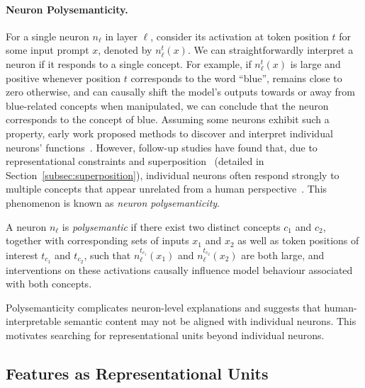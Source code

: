 \paragraph{Neuron Polysemanticity.}
For a single neuron $n_\ell$ in layer $\ell$, consider its activation at token position $t$ for some input prompt $x$, denoted by $n_\ell^{t}(x)$. We can straightforwardly interpret a neuron if it responds to a single concept. For example, if $n_\ell^{t}(x)$ is large and positive whenever position $t$ corresponds to the word ``blue'', remains close to zero otherwise, and can causally shift the model's outputs towards or away from blue-related concepts when manipulated, we can conclude that the neuron corresponds to the concept of blue. Assuming some neurons exhibit such a property, early work proposed methods to discover and interpret individual neurons' functions~. However, follow-up studies have found that, due to representational constraints and superposition~ (detailed in Section~\ref{subsec:superposition}), individual neurons often respond strongly to multiple concepts that appear unrelated from a human perspective~. This phenomenon is known as \textit{neuron polysemanticity}.



\begin{definitionbox}
A neuron $n_\ell$ is \emph{polysemantic} if there exist two distinct concepts $c_1$ and $c_2$, together with corresponding sets of inputs $x_1$ and $x_2$ as well as token positions of interest $t_{c_1}$ and $t_{c_2}$, such that $n_\ell^{t_{c_1}}(x_1)$ and $n_\ell^{t_{c_2}}(x_2)$ are both large, and interventions on these activations causally influence model behaviour associated with both concepts.

\end{definitionbox}

Polysemanticity complicates neuron-level explanations and suggests that human-interpretable semantic content may not be aligned with individual neurons. This motivates searching for representational units beyond individual neurons.

\subsection{Features as Representational Units}
\label{subsec:features}

